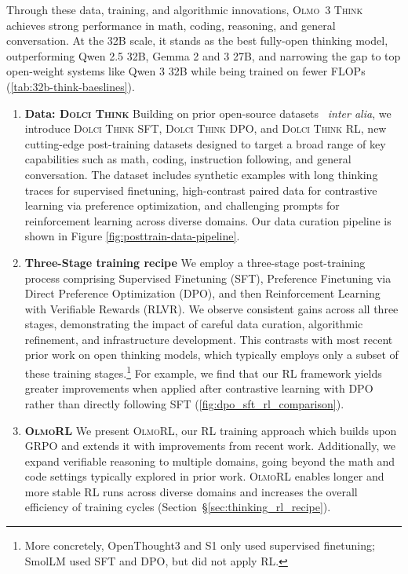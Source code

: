 \documentclass[table]{ai2style/ai2}
\newcommand{\newOlmo}{Olmo\xspace}
\newcommand{\olmothreerl}{\textsc{\newOlmo{}RL}\xspace}
\newcommand{\olmothreethinking}{\textsc{Olmo~3 Think}\xspace}
\newcommand{\dolcithink}{\textsc{Dolci Think}\xspace}
\newcommand{\dolcithinksft}{\textsc{Dolci Think SFT}\xspace}
\newcommand{\dolcithinkdpo}{\textsc{Dolci Think DPO}\xspace}
\newcommand{\dolcithinkrl}{\textsc{Dolci Think RL}\xspace}
\begin{document}
Through these data, training, and algorithmic innovations, \olmothreethinking{} achieves strong performance in math, coding, reasoning, and general conversation.
At the 32B scale, it stands as the best fully-open thinking model, outperforming Qwen 2.5 32B, Gemma 2 and 3 27B, and narrowing the gap to top open-weight systems like Qwen 3 32B while being trained on fewer FLOPs (\autoref{tab:32b-think-baeslines}).

\begin{enumerate}
\item {\bf Data: \dolcithink} 
Building on prior open-source datasets~\citep{guha2025openthoughts,lambert2024tulu3,primeintellect2025synthetic2} \emph{inter alia}, we introduce \dolcithinksft, \dolcithinkdpo, and \dolcithinkrl, new cutting-edge post-training datasets designed to target a broad range of key capabilities such as math, coding, instruction following, and general conversation.
The dataset includes synthetic examples with long thinking traces for supervised finetuning, high-contrast paired data for contrastive learning via preference optimization, and challenging prompts for reinforcement learning across diverse domains. Our data curation pipeline is shown in Figure \ref{fig:posttrain-data-pipeline}.
\item {\bf Three-Stage training recipe}
We employ a three-stage post-training process comprising Supervised Finetuning (SFT), Preference Finetuning via Direct Preference Optimization (DPO), and then Reinforcement Learning with Verifiable Rewards (RLVR).
We observe consistent gains across all three stages, demonstrating the impact of careful data curation, algorithmic refinement, and infrastructure development. This contrasts with most recent prior work on open thinking models, which typically employs only a subset of these training stages.\footnote{More concretely, OpenThought3 and S1 only used supervised finetuning; SmolLM used SFT and DPO, but did not apply RL.} For example, we find that our RL framework yields greater improvements when applied after contrastive learning with DPO rather than directly following SFT (\autoref{fig:dpo_sft_rl_comparison}).
\item {\bf \olmothreerl} We present \olmothreerl, our RL training approach which builds upon GRPO and extends it with improvements from recent work. Additionally, we expand verifiable reasoning to multiple domains, going beyond the math and code settings typically explored in prior work. \olmothreerl enables longer and more stable RL runs across diverse domains and increases the overall efficiency of training cycles (Section~\S\ref{sec:thinking_rl_recipe}).
\end{enumerate}
\end{document}
